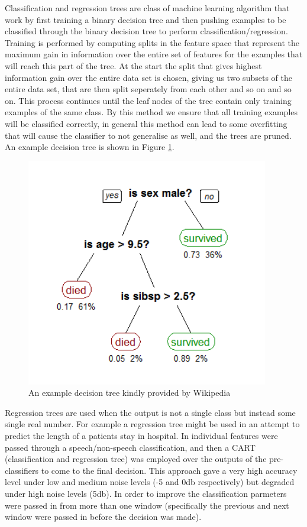 \documentclass[ %
                    author={Sam Phippen},
                supervisor={Dr. Rafal Bogacz},
                     title={Real time voice activity detectors in noisy personal computing environments},
                  subtitle={},
                    degree={MEng},
                      year={2012} ]{thesis}
\begin{document}
Classification and regression trees are class of machine learning algorithm
that work by first training a binary decision tree and then pushing examples to
be classified through the binary decision tree to perform
classification/regression. Training is performed by computing splits in the
feature space that represent the maximum gain in information over the entire
set of features for the examples that will reach this part of the tree. At the
start the split that gives highest information gain over the entire data set is
chosen, giving us two subsets of the entire data set, that are then split
seperately from each other and so on and so on. This process continues until
the leaf nodes of the tree contain only training examples of the same class. By
this method we ensure that all training examples will be classified correctly,
in general this method can lead to some overfitting that will cause the classifier
to not generalise as well, and the trees are pruned. An example decision tree
is shown in Figure \ref{fig:decision-tree}.

\begin{figure}

    \includegraphics[height=10cm]{decision_tree.png}

    \label{fig:decision-tree}
    \caption{An example decision tree kindly provided by Wikipedia}
\end{figure}

Regression trees are used when the output is not a single class but instead
some single real number. For example a regression tree might be used in an
attempt to predict the length of a patients stay in hospital. In \cite{shin}
individual features were passed through a speech/non-speech classification, and
then a CART (classification and regression tree) was employed over the outputs
of the pre-classifiers to come to the final decision. This approach gave a very
high accuracy level under low and medium noise levels (-5 and 0db respectively)
but degraded under high noise levels (5db). In order to improve the
classification parmeters were passed in from more than one window (specifically
the previous and next window were passed in before the decision was made).
\end{document}
